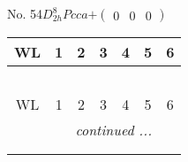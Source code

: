 \documentclass[fleqn,9pt,landscape]{jsarticle}
\begin{document}
\newpage
No. 54\quad$D_{2h}^{8}$\quad$Pcca$\quad[ orthorhombic ]\quad$+\begin{pmatrix} 0 & 0 & 0 \end{pmatrix}$
\begin{center}
\renewcommand{\arraystretch}{1.2}
\begin{longtable}{ccccccc}
 \hline \hline
WL & 1 & 2 & 3 & 4 & 5 & 6 \\ \hline \endfirsthead

\multicolumn{6}{l}{\tablename\ \thetable{}} \\
 \hline \hline
WL & 1 & 2 & 3 & 4 & 5 & 6 \\ \hline \endhead

 \hline \hline
\multicolumn{6}{r}{\footnotesize\it continued ...} \\ \endfoot

 \hline \hline
\multicolumn{6}{r}{} \\ \endlastfoot


\end{longtable}
\end{center}
\end{document}

